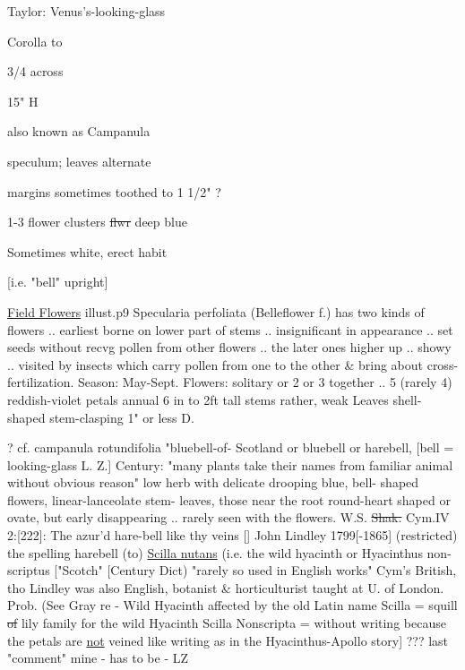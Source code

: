 \documentclass[a4paper]{article}
\begin{document}
\begin{minipage}[t]{0.6\textwidth}
Taylor: Venus's-looking-glass\par
Corolla to\par
3/4 across\par
15" H\par


also known as Campanula\par
speculum; leaves alternate\par
margins sometimes toothed to 1 1/2" ?\par
1-3 flower clusters \sout{flwr} deep blue\par
Sometimes white, erect habit\par
{[i.e. "bell" upright]}\par
\ul{Field Flowers} illust.p9 Specularia
perfoliata (Belleflower
f.)
has two kinds of flowers .. earliest
borne on lower part of stems .. insignificant
in appearance .. set seeds without recvg
pollen from other flowers .. the later ones
higher up .. showy .. visited by insects
which carry pollen from one to the other \& bring
about cross-fertilization. Season:
May-Sept. Flowers: solitary or 2 or 3
together .. 5 (rarely 4) reddish-violet petals
annual 6 in to 2ft tall stems rather,
weak Leaves shell-shaped stem-clasping
1" or less D.\par 
\color{red}
? cf. campanula rotundifolia "bluebell-of-
Scotland or bluebell or harebell,
[bell = looking-glass L. Z.] Century:
"many plants take their names from
familiar animal %
without obvious reason"
low herb with delicate drooping blue, bell-
shaped flowers, linear-lanceolate stem-
leaves, those near the root round-heart
shaped or ovate, but early disappearing
.. rarely seen with the flowers.
W.S. \sout{Shak.} Cym.IV 2:[222]: The azur'd hare-bell
like thy veins [] John Lindley 1799[-1865]
(restricted) the spelling harebell
(to) \ul{Scilla nutans} (i.e. the wild
hyacinth or Hyacinthus non-scriptus
["Scotch" [Century Dict) "rarely so used in English
works" Cym's British, tho Lindley 
was also English, botanist \& horticulturist
taught at U. of London. Prob. (See
Gray re - Wild Hyacinth affected
by the old Latin name Scilla = squill
\sout{of} lily family for the wild Hyacinth
Scilla Nonscripta = without writing
because the petals are \ul{not} veined like
writing as in the Hyacinthus-Apollo story]
\color{blue}
??? last "comment" mine
- has to be - LZ
\end{minipage}
\end{document}
